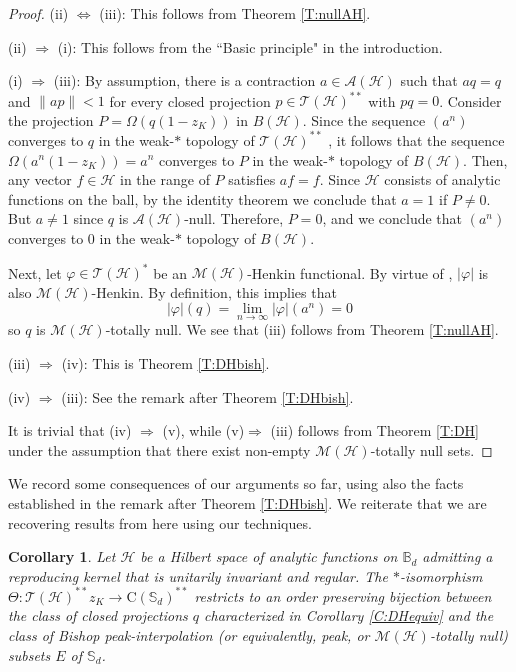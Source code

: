 \documentclass[10pt]{amsart}
\newcommand{\bB}{{\mathbb{B}}}
\newcommand{\bS}{{\mathbb{S}}}
\newcommand{\A}{{\mathcal{A}}}
\renewcommand{\H}{{\mathcal{H}}}
\newcommand{\M}{{\mathcal{M}}}
\newcommand{\T}{{\mathcal{T}}}
\newcommand{\rC}{\mathrm{C}}
\renewcommand{\phi}{\varphi}
\newtheorem{corollary}[lemma]{Corollary}
\theoremstyle{definition}
\begin{document}
\begin{proof}
(ii) $\Leftrightarrow$ (iii): This follows from Theorem \ref{T:nullAH}.

(ii) $\Rightarrow$ (i): This follows from the ``Basic principle" 
in the introduction.

(i) $\Rightarrow$ (iii):  By assumption, there is a contraction $a \in \A(\H)$ such that $aq=q$ and $\|ap\|<1$ for every closed projection $p\in \T(\H)^{**}$ with $pq=0$. Consider the projection $P=\Omega(q(1-z_K))$ in $B(\H)$. Since the sequence $(a^n)$ converges to $q$ in the weak-$*$ topology of $\T(\H)^{**}$ \cite[Lemma 3.6]{hay2007}, it follows that the sequence 
$\Omega(a^n (1-z_K))=a^n$ converges to $P$ in the weak-$*$ topology of $B(\H)$. Then, any vector $f\in \H$ in the range of $P$ satisfies $af=f$. Since $\H$ consists of analytic functions on the ball, by the identity theorem we conclude that $a=1$ if $P\neq 0$. But $a\neq 1$ since $q$ is $\A(\H)$-null. Therefore, $P=0$, and we conclude that $(a^n)$ converges to $0$ in the weak-$*$ topology of $B(\H)$. 

Next, let $\phi\in \T(\H)^*$ be an $\M(\H)$-Henkin functional. By virtue of \cite[Theorem 5.7]{CT2023Henkin}, $|\phi|$ is also $\M(\H)$-Henkin. By definition, this implies that
\[
|\phi|(q)=\lim_{n\to\infty}|\phi|(a^n)=0
\]
so $q$ is $\M(\H)$-totally null. We see that (iii) follows from Theorem \ref{T:nullAH}.



(iii) $\Rightarrow$ (iv): This is Theorem \ref{T:DHbish}.

(iv) $\Rightarrow$ (iii):  See the remark after Theorem \ref{T:DHbish}. 


It is trivial that (iv) $\Rightarrow$ (v), while (v)$\Rightarrow$ (iii) follows from Theorem \ref{T:DH} under the assumption that there exist non-empty $\M(\H)$-totally null sets.
\end{proof}

We 
record some consequences of our arguments so far, using also the facts established in the remark after Theorem \ref{T:DHbish}.  
We reiterate that we are recovering results from \cite{DH2023} here using our techniques. 

\begin{corollary}\label{bij} Let $\H$ be a Hilbert space of analytic functions on $\bB_d$ admitting  a reproducing kernel that is unitarily invariant and regular.  
The $*$-isomorphism  $\Theta:\T(\H)^{**}z_K\to \rC(\bS_d)^{**}$ restricts to an order preserving  bijection  between the 
class of closed projections $q$ characterized in Corollary \ref{C:DHequiv} and the class of Bishop peak-interpolation (or equivalently,  peak, or $\M(\H)$-totally null) subsets $E$ of $\bS_d$.
\end{corollary}
\end{document}

